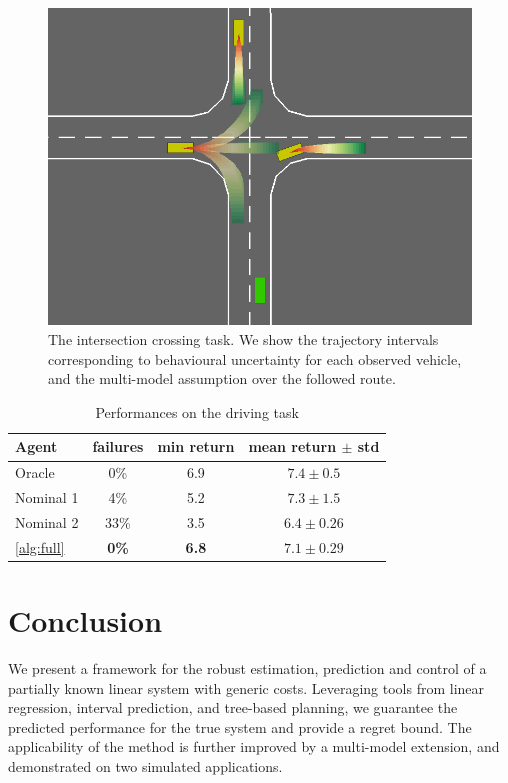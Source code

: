 \documentclass{article}
\begin{document}
\begin{figure}[t]
	\centering
	\includegraphics[width=0.7\linewidth]{img/highway-small}
	\caption{The intersection crossing task. We show the trajectory intervals corresponding to behavioural uncertainty for each observed vehicle, and the multi-model assumption over the followed route.}
\end{figure}

\begin{table}[t]
	\caption{Performances on the driving task}
	\label{tab:driving}
	\centering
	\begin{tabular}{lccc}
		\toprule
		Agent &
		failures &
        min return &
		mean return $\pm$ std  \\
		\midrule
		Oracle & 0\% & {6.9} & $7.4 \pm 0.5$ \\
		\midrule
		{Nominal 1} & 4\% & {5.2} & $\mathbf{7.3} \pm 1.5$ \\
		{Nominal 2} & 33\% & {3.5} & $6.4 \pm 0.26$ \\
		\autoref{alg:full} & \textbf{0\%} & \textbf{6.8} & $7.1 \pm 0.29$ \\
		\bottomrule
	\end{tabular}
\end{table}

\section*{Conclusion}

We present a framework for the robust estimation, prediction and control of a partially known linear system with generic costs. Leveraging tools from linear regression, interval prediction, and tree-based planning, we guarantee the predicted performance for the true system and provide a regret bound. The applicability of the method is further improved by a multi-model extension, and demonstrated on two simulated applications.
\end{document}
